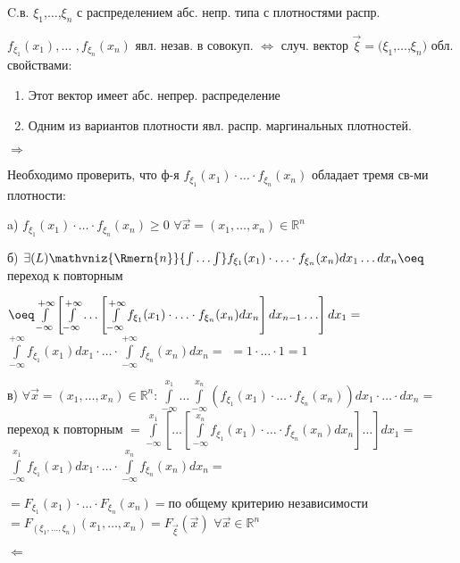 \begin{proofs}
	C.в. $\xi_1$,$\dots$,$\xi_n$ с распределением абс. непр. типа с плотностями распр.

	$f_{\xi_1}(x_1),\ldots$ $,f_{\xi_n}(x_n)$ явл. незав. в совокуп. $\iff$ случ. вектор
	$\overrightarrow{\xi} = (\xi_1$,$\dots$,$\xi_n)$ обл. свойствами:
	\begin{enumerate}
		\item Этот вектор имеет абс. непрер. распределение
		\item Одним из вариантов плотности явл. распр. маргинальных плотностей.
	\end{enumerate}
	\begin{dokvo}

		$\Rightarrow$

		Необходимо проверить, что ф-я $f_{\xi_1}(x_1)\cdot \ldots \cdot f_{\xi_n}(x_n)$
		обладает тремя св-ми плотности:

		a) $f_{\xi_1}(x_1)\cdot \ldots \cdot f_{\xi_n}(x_n) \geq 0$ $\forall \overrightarrow{x} = (x_1, \ldots, x_n) \in \mathbb{R}^n$

		б) $\exists (L) \mathvniz{\Rmern{n}}{\int\ldots\int}f_{\xi_1}(x_1)\cdot \ldots \cdot f_{\xi_n}(x_n)d x_1 \ldots d x_n \oeq$ переход к повторным

		$\oeq \int\limits_{-\infty}^{+\infty} \left[ \int\limits_{-\infty}^{+\infty} \ldots \left[ \int\limits_{-\infty}^{+\infty}f_{\xi_1}(x_1)\cdot \ldots \cdot f_{\xi_n}(x_n) dx_n \right] dx_{n-1} \ldots \right] dx_1 =$
		$\int\limits_{-\infty}^{+\infty} f_{\xi_1}(x_1)dx_1 \cdot \ldots \cdot \int\limits_{-\infty}^{+\infty} f_{\xi_n}(x_n)dx_n =$
		$= 1 \cdot \ldots \cdot 1 = 1$

		в) $\forall \overrightarrow{x} = (x_1, \ldots, x_n) \in \mathbb{R}^n : \int\limits_{-\infty}^{x_1} \ldots \int\limits_{-\infty}^{x_n}(f_{\xi_1}(x_1)\cdot \ldots \cdot f_{\xi_n}(x_n))dx_1 \cdot \ldots \cdot dx_n =$ переход к повторным
		$= \int\limits_{-\infty}^{x_1} \left[\ldots \left[ \int\limits_{-\infty}^{x_n}f_{\xi_1}(x_1)\cdot \ldots \cdot f_{\xi_n}(x_n) dx_n \right] \ldots \right] dx_1 = $
		$\int\limits_{-\infty}^{x_1} f_{\xi_1}(x_1)dx_1 \cdot \ldots \cdot \int\limits_{-\infty}^{x_n} f_{\xi_n}(x_n)dx_n =$

		$=F_{\xi_1}(x_1)\cdot \ldots \cdot F_{\xi_n}(x_n)=$по общему критерию независимости $= F_{(\xi_1, \ldots, \xi_n)}(x_1, \ldots, x_n) = F_{\overrightarrow{\xi}}(\overrightarrow{x})$
		$\forall \overrightarrow{x} \in \mathbb{R}^n$

		$\Leftarrow$


\end{dokvo}
\end{proofs}
